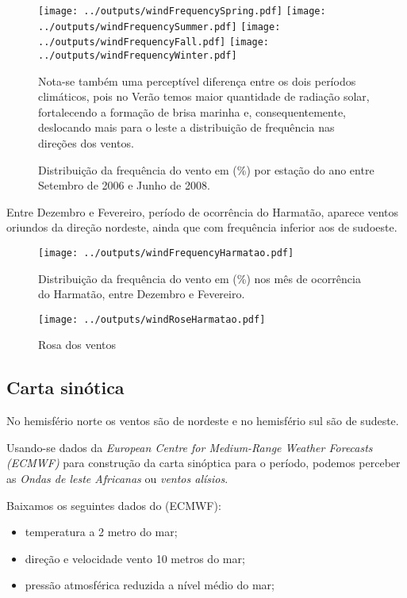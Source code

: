 \begin{figure}[H]
\begin{center}
  \texttt{[image: ../outputs/windFrequencySpring.pdf]}
  \texttt{[image: ../outputs/windFrequencySummer.pdf]}
  \texttt{[image: ../outputs/windFrequencyFall.pdf]}
  \texttt{[image: ../outputs/windFrequencyWinter.pdf]}
\end{center}

Nota-se também uma perceptível diferença entre os dois períodos climáticos, pois no Verão temos maior quantidade de radiação solar, fortalecendo a formação de brisa marinha e, consequentemente, deslocando mais para o leste a distribuição de frequência nas direções dos ventos.


\caption{Distribuição da frequência do vento em (\%) por estação do ano entre
         Setembro de 2006 e Junho de 2008.}
\end{figure}

Entre Dezembro e Fevereiro, período de ocorrência do Harmatão, aparece 
ventos oriundos da direção nordeste, ainda que com frequência inferior 
aos de sudoeste.




\begin{figure}[H]
\begin{center}
  \texttt{[image: ../outputs/windFrequencyHarmatao.pdf]}
\end{center}
\caption{Distribuição da frequência do vento em (\%) nos mês de ocorrência
         do Harmatão, entre Dezembro e Fevereiro.}
\end{figure}

\begin{figure}[H]
\begin{center}
  \texttt{[image: ../outputs/windRoseHarmatao.pdf]}
  \caption{Rosa dos ventos}
\end{center}
\end{figure}



\subsection{Carta sinótica}


No hemisfério norte os ventos são de nordeste e no hemisfério sul são de sudeste. 


Usando-se dados da \textit{European Centre for Medium-Range Weather Forecasts (ECMWF)}
para construção da carta sinóptica para o período, podemos perceber as 
\textit{Ondas de leste Africanas} ou \textit{ventos alísios}.

Baixamos os seguintes dados do (ECMWF):
\begin{itemize}
  \item temperatura a 2 metro do mar;
  \item direção e velocidade vento 10 metros do mar;
  \item pressão atmosférica reduzida a nível médio do mar;
\end{itemize}



